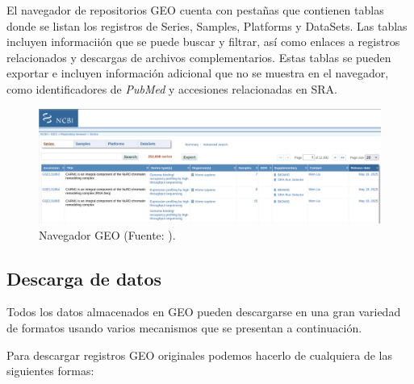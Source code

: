 El navegador de repositorios GEO cuenta con pestañas que contienen tablas donde se listan los registros de Series, Samples, Platforms y DataSets. Las tablas incluyen informaciión que se 
puede buscar y filtrar, así como enlaces a registros relacionados y descargas de archivos complementarios. Estas tablas se pueden exportar e incluyen información adicional que no se muestra
en el navegador, como identificadores de \textit{PubMed} y accesiones relacionadas en SRA.

\begin{figure}[h]
    \centering
    \includegraphics[width=1\textwidth]{../img/geo-browser.png}
    \caption{Navegador GEO (Fuente: ).}
\end{figure}

\subsection{Descarga de datos}

Todos los datos almacenados en GEO pueden descargarse en una gran variedad de formatos usando varios mecanismos que se presentan a continuación.

Para descargar registros GEO originales podemos hacerlo de cualquiera de las siguientes formas:

